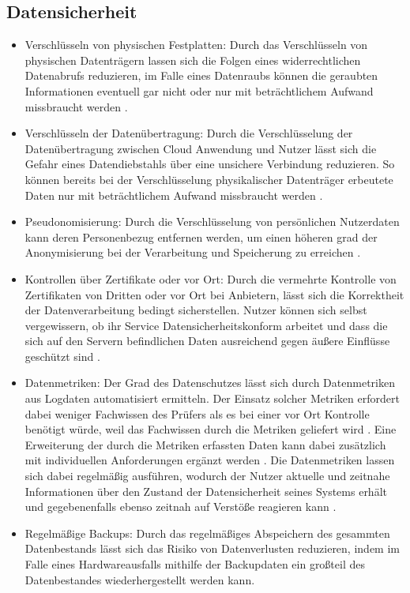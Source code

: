\subsection{Datensicherheit} 
\begin{itemize}
\item
Verschlüsseln von physischen Festplatten: Durch das Verschlüsseln von physischen Datenträgern lassen sich die Folgen eines widerrechtlichen Datenabrufs reduzieren, im Falle eines Datenraubs können die geraubten Informationen eventuell gar nicht oder nur mit beträchtlichem Aufwand missbraucht werden \cite{selzer2020}.
\item
Verschlüsseln der Datenübertragung: Durch die Verschlüsselung der Datenübertragung zwischen Cloud Anwendung und Nutzer lässt sich die Gefahr eines Datendiebstahls über eine unsichere Verbindung reduzieren. So können bereits bei der Verschlüsselung physikalischer Datenträger erbeutete Daten nur mit beträchtlichem Aufwand missbraucht werden \cite{selzer2020}.
\item
Pseudonomisierung: Durch die Verschlüsselung von persönlichen Nutzerdaten kann deren  Personenbezug entfernen werden, um einen höheren grad der Anonymisierung bei der Verarbeitung und Speicherung zu erreichen \cite{selzer2020}.
\item
Kontrollen über Zertifikate oder vor Ort: Durch die vermehrte Kontrolle von Zertifikaten von Dritten oder vor Ort bei Anbietern, lässt sich die Korrektheit der Datenverarbeitung bedingt sicherstellen. Nutzer können sich selbst vergewissern, ob ihr Service Datensicherheitskonform arbeitet und dass die sich auf den Servern befindlichen Daten ausreichend gegen äußere Einflüsse geschützt sind \cite{selzer2020}. 
\item 
Datenmetriken: Der Grad des Datenschutzes lässt sich durch Datenmetriken aus Logdaten automatisiert ermitteln. Der Einsatz solcher Metriken erfordert dabei weniger Fachwissen des Prüfers als es bei einer vor Ort Kontrolle benötigt würde, weil das Fachwissen durch die Metriken geliefert wird \cite{selzer2020}. Eine Erweiterung der durch die Metriken erfassten Daten kann dabei zusätzlich mit individuellen Anforderungen ergänzt werden \cite{selzer2020}. Die Datenmetriken lassen sich dabei regelmäßig ausführen, wodurch der Nutzer aktuelle und zeitnahe Informationen über den Zustand der Datensicherheit seines Systems erhält und gegebenenfalls ebenso zeitnah auf Verstöße reagieren kann \cite{selzer2020}.
\item 
Regelmäßige Backups: Durch das regelmäßiges Abspeichern des gesammten Datenbestands lässt sich das Risiko von Datenverlusten reduzieren, indem im Falle eines Hardwareausfalls mithilfe der Backupdaten ein großteil des Datenbestandes wiederhergestellt werden kann.
\end{itemize}


